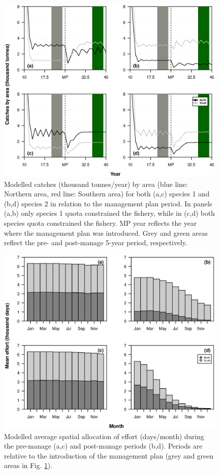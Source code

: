 \documentclass[12pt,oneline,a4paper,numbib]{ouparticle}
\numberwithin{equation}{subsection} %
\begin{document}
\begin{figure}[!ht]
\centering
\includegraphics[width=\textwidth]{Figures/Catchesbyarea.eps} 
\caption{Modelled catches (thousand tonnes/year) by area (blue line: Northern area, red line: Southern area) for both (a,c) species 1 and (b,d) species 2 in relation to the management plan period. In panels (a,b) only species 1 quota constrained the fishery, while in (c,d) both species quota constrained the fishery. MP year reflects the year where the management plan was introduced. Grey and green areas reflect the pre- and post-manage 5-year period, respectively.}
\label{f:catchesbyarea}
\end{figure} 

\begin{figure}[!ht]
\centering
\includegraphics[width=\textwidth]{Figures/Meaneffort.eps} 
\caption{Modelled average spatial allocation of effort (days/month) during the pre-manage (a,c) and post-manage periods (b,d). Periods are relative to the introduction of the management plan (grey and green areas in Fig. \ref{f:catchesbyarea}).}
\end{figure}
\end{document}
